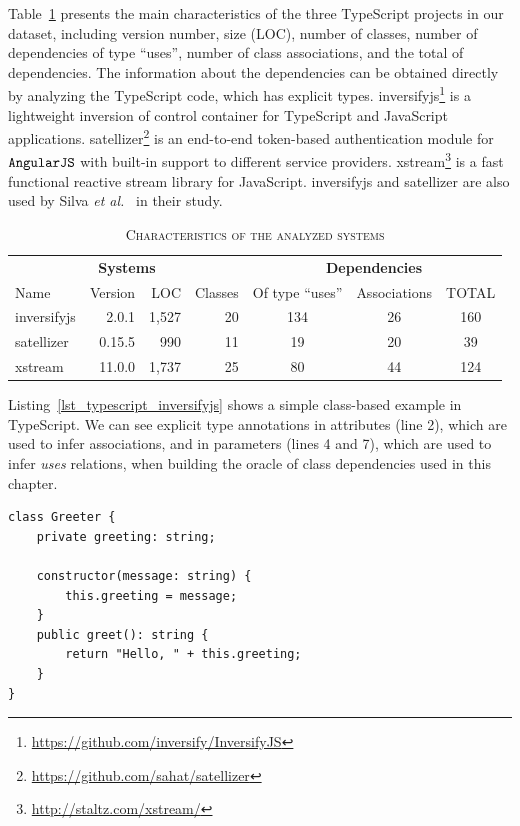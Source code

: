 \documentclass[review]{elsarticle}
\newcommand{\aspas}[1]{{``#1''}}
\newcommand{\mcode}[1]{$\tt #1$}
\begin{document}
Table~\ref{tab:dataset} presents the main characteristics of the three TypeScript projects in our dataset, including version number, size (LOC), number of classes, number of dependencies of type \aspas{uses}, number of class associations, and the total of dependencies. The information about the dependencies can be obtained directly by analyzing the TypeScript code, which has explicit types. {\sc inversifyjs}\footnote{\url{https://github.com/inversify/InversifyJS}} is a lightweight inversion of control container for TypeScript and JavaScript applications. {\sc satellizer}\footnote{\url{https://github.com/sahat/satellizer}} is an end-to-end token-based authentication module for \mcode{AngularJS} with built-in support to different service providers. {\sc xstream}\footnote{\url{http://staltz.com/xstream/}} is a fast functional reactive stream library for JavaScript. {\sc inversifyjs} and {\sc satellizer} are also used by Silva \emph{et al.}~\cite{sanerera2017} in their study.


\begin{table}[!ht]
	\scriptsize	
	\centering
	\caption{\textsc{Characteristics of the analyzed systems}}
	\tabcolsep=0.11cm
	\begin{tabular}{lrrr|ccc}
		\toprule
		\multicolumn{4}{c|}{\textbf{Systems}} & \multicolumn{3}{c}{\textbf{Dependencies}}  \\
		Name & Version & LOC & Classes & Of type \aspas{uses} & Associations & TOTAL  \\
		\midrule
		{\sc inversifyjs} & 2.0.1   & 1,527 &         20 & 134 & 26 & 160  \\
		{\sc satellizer}   & 0.15.5 &   990 &          11 & 19 & 20 & 39  \\
		{\sc xstream}    &  11.0.0 & 1,737 &         25 & 80 &  44 & 124  \\
		\bottomrule
	\end{tabular}
	\label{tab:dataset}
\end{table}



Listing~\ref{lst_typescript_inversifyjs} shows a simple class-based example in TypeScript. We can see explicit type annotations in attributes (line 2), which are used to infer associations, and in parameters (lines 4 and 7), which are used to infer \textit{uses} relations, when building the oracle of class dependencies used in this chapter. 

\begin{lstlisting}[caption=Example of class in TypeScript, label=lst_typescript_inversifyjs, emph={[2]string,boolean},emphstyle={[2]\ttfamily\bfseries\color{darkgreen}}]
class Greeter {
	private greeting: string;

	constructor(message: string) {
		this.greeting = message;
	}
	public greet(): string {
		return "Hello, " + this.greeting;
	}
}  
\end{lstlisting} 
\end{document}
